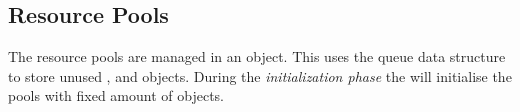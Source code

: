 \subsection{Resource Pools} %
\label{sub:resource_pools}
The resource pools are managed in an  object. This uses the queue data structure to store unused ,  and  objects. During the \textit{initialization phase} the  will initialise the pools with fixed amount of objects.

